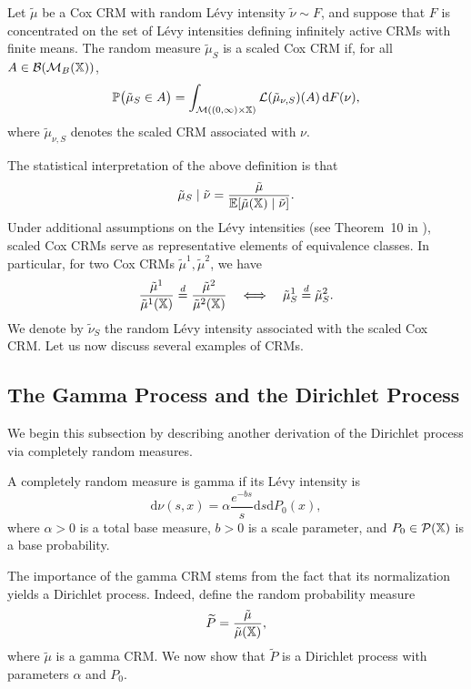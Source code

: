 \begin{definition}\label{definition:scaled_cox_crm}
Let $\tilde{\mu}$ be a Cox CRM with random L\'evy intensity $\tilde{\nu} \sim F$, and suppose that $F$ is concentrated on the set of L\'evy intensities defining infinitely active CRMs with finite means. The random measure $\tilde{\mu}_S$ is a scaled Cox CRM if, for all $A \in \mathcal{B}(\mathcal{M}_B(\mathbb{X}))$,
\[
\mathbb{P}\bigl(\tilde{\mu}_S \in A\bigr)
    = \int_{\mathcal{M}((0,\infty)\times \mathbb{X})} \mathcal{L}(\tilde{\mu}_{\nu,S})(A)\,\mathrm{d}F(\nu),
\]
where $\tilde{\mu}_{\nu,S}$ denotes the scaled CRM associated with $\nu$.
\end{definition}
The statistical interpretation of the above definition is that 
\[
\tilde{\mu}_S \mid \tilde{\nu} = \frac{\tilde{\mu}}{\mathbb{E} [\tilde{\mu}(\mathbb{X})\mid\tilde{\nu}]}.
\]
Under additional assumptions on the L\'evy intensities (see Theorem~10 in \cite{catalano2026merging}), scaled Cox CRMs serve as representative elements of equivalence classes. In particular, for two Cox CRMs $\tilde{\mu}^1, \tilde{\mu}^2$, we have
\[
\frac{\tilde{\mu}^1}{\tilde{\mu}^1(\mathbb{X})} \overset{d}{=} \frac{\tilde{\mu}^2}{\tilde{\mu}^2(\mathbb{X})} 
\quad \Longleftrightarrow \quad
\tilde{\mu}^1_S \overset{d}{=} \tilde{\mu}^2_S.
\]
We denote by $\tilde{\nu}_S$ the random L\'evy intensity associated with the scaled Cox CRM. Let us now discuss several examples of CRMs.

\subsection{The Gamma Process and the Dirichlet Process}\label{subsection:bnp_toolbox_gamma_dirichlet}

We begin this subsection by describing another derivation of the Dirichlet process via completely random measures.

\begin{definition}\label{definition:gamma_crm}
A completely random measure is gamma if its L\'evy intensity is
\[
\mathrm{d}\nu(s,x) = \alpha \frac{e^{-b s}}{s}\mathrm{d}s \mathrm{d}P_0(x),
\]
where $\alpha > 0$ is a total base measure, $b > 0$ is a scale parameter, and $P_0 \in \mathcal{P}(\mathbb{X})$ is a base probability.
\end{definition}

The importance of the gamma CRM stems from the fact that its normalization yields a Dirichlet process. Indeed, define the random probability measure
\[
\widetilde{P}=\frac{\tilde{\mu}}{\tilde{\mu}(\mathbb{X})},
\]
where $\tilde{\mu}$ is a gamma CRM. We now show that $\widetilde{P}$ is a Dirichlet process with parameters $\alpha$ and $P_0$.

